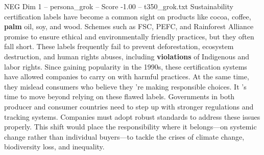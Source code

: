 \begin{textsample}{NEG Dim 1 – persona\_grok – Score -1.00 – t350\_grok.txt}  \label{ex:f1_neg_025}
Sustainability certification labels have become a common sight on products like cocoa, coffee, \textbf{palm} oil, soy, and wood.
Schemes such as FSC, PEFC, and Rainforest Alliance promise to ensure ethical and environmentally friendly practices, but they often fall short.
These labels frequently fail to prevent deforestation, ecosystem destruction, and human rights abuses, including \textbf{violations} of Indigenous and labor rights.
Since gaining popularity in the 1990s, these certification systems have allowed companies to carry on with harmful practices.
At the same time, they mislead consumers who believe they 're making responsible choices.
It 's time to move beyond relying on these flawed labels.
Governments in both producer and consumer countries need to step up with stronger regulations and tracking systems.
Companies must adopt robust standards to address these issues properly.
This shift would place the responsibility where it belongs—on systemic change rather than individual buyers—to tackle the crises of climate change, biodiversity loss, and inequality.

\end{textsample}
